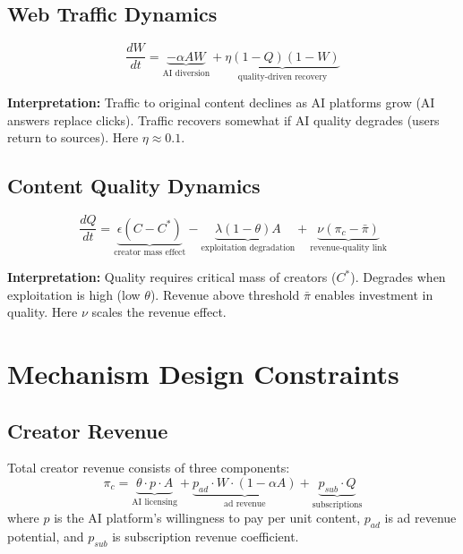 \documentclass[11pt,a4paper]{article}
\begin{document}
\subsection{Web Traffic Dynamics}

\begin{equation}
\boxed{
\frac{dW}{dt} = \underbrace{-\alpha AW}_{\text{AI diversion}} + \underbrace{\eta(1-Q)(1-W)}_{\text{quality-driven recovery}}
}
\end{equation}

\textbf{Interpretation:} Traffic to original content declines as AI platforms grow (AI answers replace clicks). Traffic recovers somewhat if AI quality degrades (users return to sources). Here $\eta \approx 0.1$.

\subsection{Content Quality Dynamics}

\begin{equation}
\boxed{
\frac{dQ}{dt} = \underbrace{\epsilon(C - C^*)}_{\text{creator mass effect}} - \underbrace{\lambda(1-\theta)A}_{\text{exploitation degradation}} + \underbrace{\nu(\pi_c - \bar{\pi})}_{\text{revenue-quality link}}
}
\end{equation}

\textbf{Interpretation:} Quality requires critical mass of creators ($C^*$). Degrades when exploitation is high (low $\theta$). Revenue above threshold $\bar{\pi}$ enables investment in quality. Here $\nu$ scales the revenue effect.

\section{Mechanism Design Constraints}

\subsection{Creator Revenue}

Total creator revenue consists of three components:
\begin{equation}
\pi_c = \underbrace{\theta \cdot p \cdot A}_{\text{AI licensing}} + \underbrace{p_{ad} \cdot W \cdot (1-\alpha A)}_{\text{ad revenue}} + \underbrace{p_{sub} \cdot Q}_{\text{subscriptions}}
\end{equation}
where $p$ is the AI platform's willingness to pay per unit content, $p_{ad}$ is ad revenue potential, and $p_{sub}$ is subscription revenue coefficient.
\end{document}
